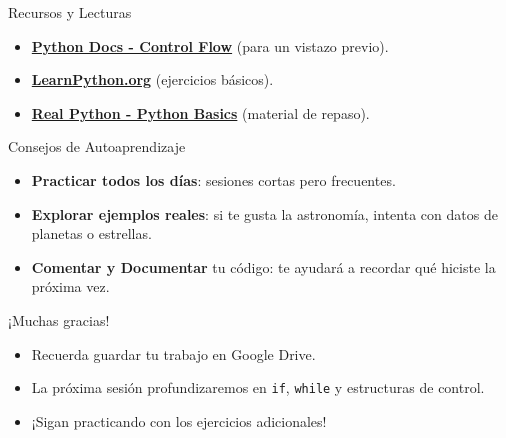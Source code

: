 \documentclass[10pt]{beamer}
\begin{document}
\begin{frame}{Recursos y Lecturas}
  \begin{itemize}
    \item \href{https://docs.python.org/3/tutorial/controlflow.html}{\textbf{Python Docs - Control Flow}} (para un vistazo previo).
    \item \href{https://www.learnpython.org/}{\textbf{LearnPython.org}} (ejercicios básicos).
    \item \href{https://realpython.com/python-basics/}{\textbf{Real Python - Python Basics}} (material de repaso).
  \end{itemize}
\end{frame}

\begin{frame}{Consejos de Autoaprendizaje}
  \begin{itemize}
    \item \textbf{Practicar todos los días}: sesiones cortas pero frecuentes.
    \item \textbf{Explorar ejemplos reales}: si te gusta la astronomía, intenta con datos de planetas o estrellas.
    \item \textbf{Comentar y Documentar} tu código: te ayudará a recordar qué hiciste la próxima vez.
  \end{itemize}
\end{frame}

\begin{frame}
  \Huge{\centerline{¡Muchas gracias!}}
  \vspace{0.3cm}
  \normalsize
  \begin{itemize}
    \item Recuerda guardar tu trabajo en Google Drive.
    \item La próxima sesión profundizaremos en \texttt{if}, \texttt{while} y estructuras de control.
    \item ¡Sigan practicando con los ejercicios adicionales!
  \end{itemize}
\end{frame}
\end{document}
